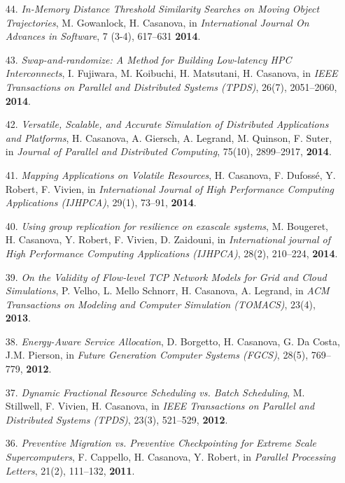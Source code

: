 \begin{enumerate}
\item [44.] {\it In-Memory Distance Threshold Similarity Searches on Moving
Object Trajectories}, M. Gowanlock, H. Casanova, in \emph{International
Journal On Advances in Software},  7 (3-4), 617--631 {\bf 2014}.

\item [43.] {\it Swap-and-randomize: A Method for Building Low-latency HPC Interconnects}, I. Fujiwara, M. Koibuchi, H. Matsutani, H. Casanova,
    in \emph{IEEE Transactions on Parallel and Distributed Systems (TPDS)}, 26(7),  2051--2060,  {\bf 2014}.

\item [42.] {\it Versatile, Scalable, and Accurate Simulation of Distributed Applications and Platforms},
H. Casanova, A. Giersch, A. Legrand, M. Quinson, F. Suter,
in \emph{Journal of Parallel and Distributed Computing},
75(10), 2899--2917, {\bf 2014}.

\item [41.] {\it Mapping Applications on Volatile Resources},
H. Casanova, F. Dufoss\'e, Y. Robert, F. Vivien,
in \emph{International Journal of High Performance Computing Applications (IJHPCA)}, 29(1), 73--91, {\bf 2014}.

\item[40.] {\it Using group replication for resilience on exascale systems},
M. Bougeret, H. Casanova, Y. Robert, F. Vivien, D. Zaidouni,
in \emph{International journal of High Performance Computing Applications (IJHPCA)},
28(2), 210--224, {\bf 2014}.

\item[39.] {\it On the Validity of Flow-level TCP Network Models for Grid and Cloud Simulations}, P. Velho, L. Mello Schnorr, H. Casanova, A. Legrand,
    in \emph{ACM Transactions on Modeling and Computer Simulation (TOMACS)}, 23(4),
{\bf 2013}.

\item[38.] {\it Energy-Aware Service Allocation}, D. Borgetto, H. Casanova, G. Da Costa, J.M. Pierson, in \emph{Future Generation Computer Systems (FGCS)}, 28(5), 769--779, {\bf 2012}.

\item[37.] {\it Dynamic Fractional Resource Scheduling vs. Batch Scheduling}, M. Stillwell, F. Vivien, H. Casanova, in \emph{IEEE Transactions on Parallel and Distributed Systems (TPDS)}, 23(3), 521--529, {\bf 2012}.

\item[36.] {\it Preventive Migration vs. Preventive Checkpointing for Extreme Scale Supercomputers}, F. Cappello, H. Casanova, Y. Robert, in \emph{Parallel Processing Letters}, 21(2), 111--132, {\bf 2011}.


\end{enumerate}
